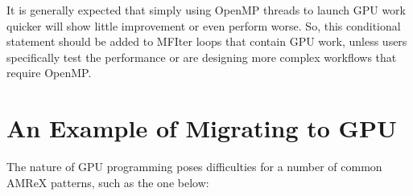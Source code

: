 \documentclass[letterpaper,10pt,english]{sphinxmanual}
\begin{document}
\sphinxAtStartPar
It is generally expected that simply using OpenMP threads to launch GPU work quicker
will show little improvement or even perform worse. So, this conditional statement
should be added to MFIter loops that contain GPU work, unless users specifically test
the performance or are designing more complex workflows that require OpenMP.


\section{An Example of Migrating to GPU}
\label{\detokenize{GPU:an-example-of-migrating-to-gpu}}\label{\detokenize{GPU:sec-gpu-example}}
\sphinxAtStartPar
The nature of GPU programming poses difficulties for a number
of common AMReX patterns, such as the one below:

\begin{sphinxVerbatim}[commandchars=\\\{\}]
   
      
        
        

      \PYG{p}{[}\PYG{p}{]}

     \PYG{p}{[}\PYG{p}{]} 
\end{sphinxVerbatim}
\end{document}

